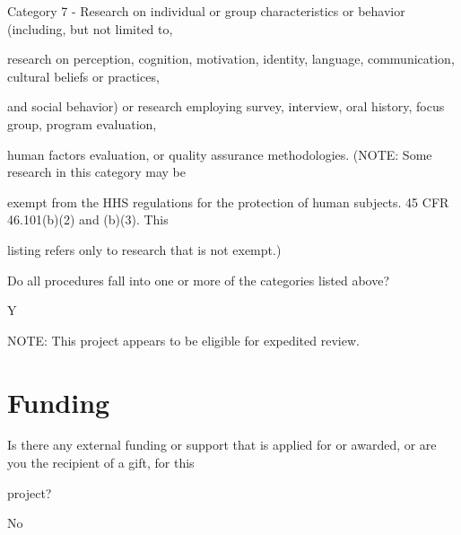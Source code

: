 \documentclass[10pt, letterpaper]{article}
\begin{document}
\noindent \makebox[0pt][l]{\color{columbiablue_official}$\boxtimes$}\hspace{1.2em} Category 7 - Research on individual or group characteristics or behavior (including, but not limited to,

\begin{responsebox}

research on perception, cognition, motivation, identity, language, communication, cultural beliefs or practices,

and social behavior) or research employing survey, interview, oral history, focus group, program evaluation,

\vspace{0.5em}

human factors evaluation, or quality assurance methodologies. (NOTE: Some research in this category may be

exempt from the HHS regulations for the protection of human subjects. 45 CFR 46.101(b)(2) and (b)(3). This

listing refers only to research that is not exempt.)

Do all procedures fall into one or more of the categories listed above?

Y

NOTE: This project appears to be eligible for expedited review.

\vspace{0.5em}

\vspace{0.5em}

\vspace{0.5em}

\end{responsebox}

\section*{Funding}

\vspace{0.5em}

Is there any external funding or support that is applied for or awarded, or are you the recipient of a gift, for this

project?

No

\vspace{0.5em}

\vspace{0.5em}

\vspace{0.5em}
\end{document}
